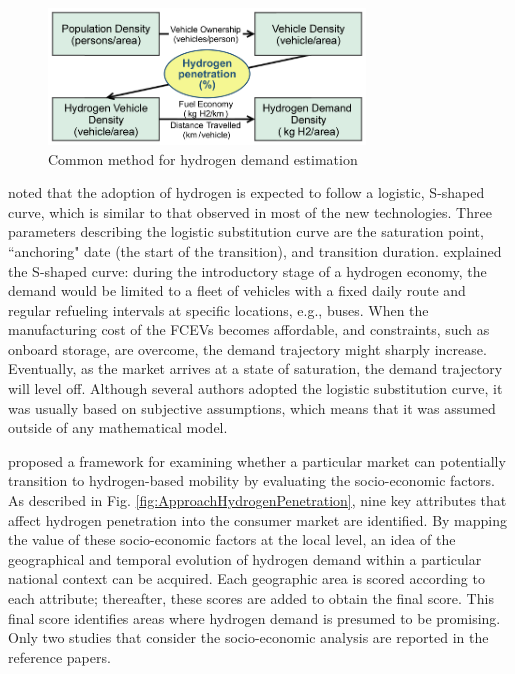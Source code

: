 \documentclass[11pt,3p]{elsarticle}
\begin{document}
\begin{figure}[!htbp]
\centering
\includegraphics[width=0.75\textwidth]{FIG_11}
\caption{\label{fig:CommonMethodDemand}Common method for hydrogen demand estimation}
\end{figure}

\citet{agnolucci2013designing} noted that the adoption of hydrogen is expected to follow a logistic, S-shaped curve, which is similar to that observed in most of the new technologies. Three parameters describing the logistic substitution curve are the saturation point, ``anchoring" date (the start of the transition), and transition duration. \citet{almansoori2009design} explained the S-shaped curve: during the introductory stage of a hydrogen economy, the demand would be limited to a fleet of vehicles with a fixed daily route and regular refueling intervals at specific locations, e.g., buses. When the manufacturing cost of the FCEVs becomes affordable, and constraints, such as onboard storage, are overcome, the demand trajectory might sharply increase. Eventually, as the market arrives at a state of saturation, the demand trajectory will level off. Although several authors adopted the logistic substitution curve, it was usually based on subjective assumptions, which means that it was assumed outside of any mathematical model.

\citet{melendez2008regional} proposed a framework for examining whether a particular market can potentially transition to hydrogen-based mobility by evaluating the socio-economic factors. As described in Fig. \ref{fig:ApproachHydrogenPenetration}, nine key attributes that affect hydrogen penetration into the consumer market are identified. By mapping the value of these socio-economic factors at the local level, an idea of the geographical and temporal evolution of hydrogen demand within a particular national context \citep{agnolucci2013designing} can be acquired. Each geographic area is scored according to each attribute; thereafter, these scores are added to obtain the final score. This final score identifies areas where hydrogen demand is presumed to be promising. Only two studies \citep{dayhim2014planning,moreno2017towards} that consider the socio-economic analysis are reported in the reference papers.
\end{document}
